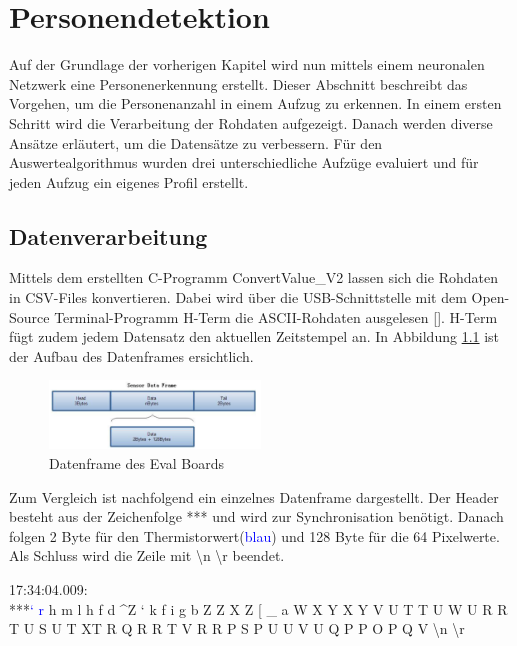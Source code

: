 \chapter{Personendetektion}
\label{chap:Personendetektion}

Auf der Grundlage der vorherigen Kapitel wird nun mittels einem neuronalen Netzwerk eine Personenerkennung erstellt. Dieser Abschnitt beschreibt das Vorgehen, um die Personenanzahl in einem Aufzug zu erkennen. In einem ersten Schritt wird die Verarbeitung der Rohdaten aufgezeigt. Danach werden diverse Ansätze erläutert, um die Datensätze zu verbessern. Für den Auswertealgorithmus wurden drei unterschiedliche Aufzüge evaluiert und für jeden Aufzug ein eigenes Profil erstellt. 

\section{Datenverarbeitung}
\label{Datenverarbeitung}

Mittels dem erstellten C-Programm ConvertValue\_V2 lassen sich die Rohdaten in \ac{CSV}-Files konvertieren. Dabei wird über die USB-Schnittstelle mit dem Open-Source Terminal-Programm H-Term die \ac{ASCII}-Rohdaten ausgelesen [\protect\cite{HTERM}].
H-Term fügt zudem jedem Datensatz den aktuellen Zeitstempel an. In Abbildung \ref{fig:Dataframe} ist der Aufbau des Datenframes ersichtlich.

\begin{figure}[H]
	\centering
	\includegraphics[width=0.5\textwidth]
	{fig/Dataframe}
	\caption[Datenframedes des Eval Boards]{Datenframe des Eval Boards}
	\label{fig:Dataframe}
\end{figure}

Zum Vergleich ist nachfolgend ein einzelnes Datenframe dargestellt. Der Header besteht aus der Zeichenfolge *** und wird zur Synchronisation benötigt. Danach folgen 2 Byte für den Thermistorwert(\textcolor{blue}{blau}) und 128 Byte für die 64 Pixelwerte. Als Schluss wird die Zeile mit \textbackslash n \textbackslash r beendet.

17:34:04.009: \\
***\textcolor{blue}{‘ r} h m l h f d \^ \space \space Z ` k f i g b Z Z X Z [ \_ a W X Y X Y V U T T U W U R R T U S U T XT R Q R R T V R R P S P U U V U Q P P O P Q V  \textbackslash n \textbackslash r \\


